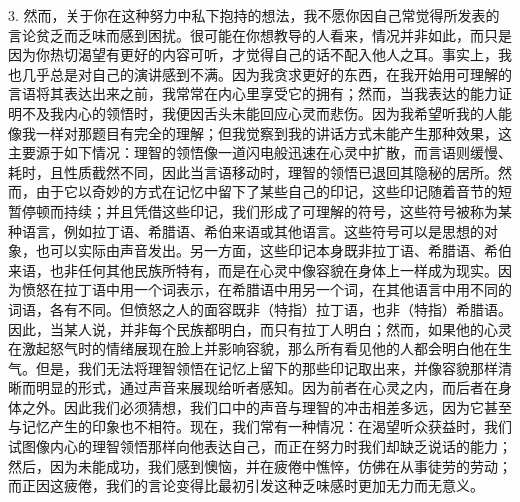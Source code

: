 3. 然而，关于你在这种努力中私下抱持的想法，我不愿你因自己常觉得所发表的言论贫乏而乏味而感到困扰。很可能在你想教导的人看来，情况并非如此，而只是因为你热切渴望有更好的内容可听，才觉得自己的话不配入他人之耳。事实上，我也几乎总是对自己的演讲感到不满。因为我贪求更好的东西，在我开始用可理解的言语将其表达出来之前，我常常在内心里享受它的拥有；然而，当我表达的能力证明不及我内心的领悟时，我便因舌头未能回应心灵而悲伤。因为我希望听我的人能像我一样对那题目有完全的理解；但我觉察到我的讲话方式未能产生那种效果，这主要源于如下情况：理智的领悟像一道闪电般迅速在心灵中扩散，而言语则缓慢、耗时，且性质截然不同，因此当言语移动时，理智的领悟已退回其隐秘的居所。然而，由于它以奇妙的方式在记忆中留下了某些自己的印记，这些印记随着音节的短暂停顿而持续；并且凭借这些印记，我们形成了可理解的符号，这些符号被称为某种语言，例如拉丁语、希腊语、希伯来语或其他语言。这些符号可以是思想的对象，也可以实际由声音发出。另一方面，这些印记本身既非拉丁语、希腊语、希伯来语，也非任何其他民族所特有，而是在心灵中像容貌在身体上一样成为现实。因为愤怒在拉丁语中用一个词表示，在希腊语中用另一个词，在其他语言中用不同的词语，各有不同。但愤怒之人的面容既非（特指）拉丁语，也非（特指）希腊语。因此，当某人说，并非每个民族都明白，而只有拉丁人明白；然而，如果他的心灵在激起怒气时的情绪展现在脸上并影响容貌，那么所有看见他的人都会明白他在生气。但是，我们无法将理智领悟在记忆上留下的那些印记取出来，并像容貌那样清晰而明显的形式，通过声音来展现给听者感知。因为前者在心灵之内，而后者在身体之外。因此我们必须猜想，我们口中的声音与理智的冲击相差多远，因为它甚至与记忆产生的印象也不相符。现在，我们常有一种情况：在渴望听众获益时，我们试图像内心的理智领悟那样向他表达自己，而正在努力时我们却缺乏说话的能力；然后，因为未能成功，我们感到懊恼，并在疲倦中憔悴，仿佛在从事徒劳的劳动；而正因这疲倦，我们的言论变得比最初引发这种乏味感时更加无力而无意义。\par

